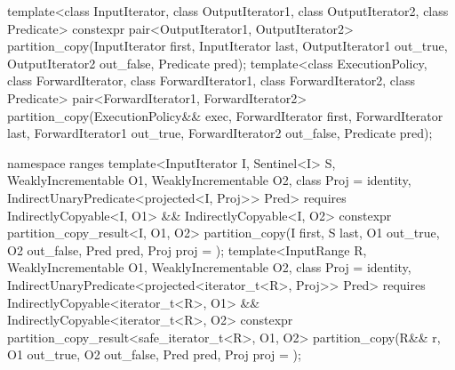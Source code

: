 %
\begin{itemdecl}
template<class InputIterator, class OutputIterator1,
         class OutputIterator2, class Predicate>
  constexpr pair<OutputIterator1, OutputIterator2>
    partition_copy(InputIterator first, InputIterator last,
                   OutputIterator1 out_true, OutputIterator2 out_false, Predicate pred);
template<class ExecutionPolicy, class ForwardIterator, class ForwardIterator1,
         class ForwardIterator2, class Predicate>
  pair<ForwardIterator1, ForwardIterator2>
    partition_copy(ExecutionPolicy&& exec,
                   ForwardIterator first, ForwardIterator last,
                   ForwardIterator1 out_true, ForwardIterator2 out_false, Predicate pred);

namespace ranges {
  template<InputIterator I, Sentinel<I> S, WeaklyIncrementable O1, WeaklyIncrementable O2,
      class Proj = identity, IndirectUnaryPredicate<projected<I, Proj>> Pred>
    requires IndirectlyCopyable<I, O1> && IndirectlyCopyable<I, O2>
    constexpr partition_copy_result<I, O1, O2>
      partition_copy(I first, S last, O1 out_true, O2 out_false, Pred pred,
                     Proj proj = {});
  template<InputRange R, WeaklyIncrementable O1, WeaklyIncrementable O2,
      class Proj = identity,
      IndirectUnaryPredicate<projected<iterator_t<R>, Proj>> Pred>
    requires IndirectlyCopyable<iterator_t<R>, O1> &&
      IndirectlyCopyable<iterator_t<R>, O2>
    constexpr partition_copy_result<safe_iterator_t<R>, O1, O2>
      partition_copy(R&& r, O1 out_true, O2 out_false, Pred pred, Proj proj = {});
}
\end{itemdecl}

